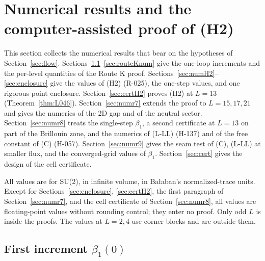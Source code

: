 \section{Numerical results and the computer-assisted proof of (H2)}\label{sec:numerics}

This section collects the numerical results that bear on the hypotheses of Section~\ref{sec:flow}. Sections~\ref{sec:beta1}--\ref{sec:routeKnum} give the one-loop increments and the per-level quantities of the Route K proof. Sections~\ref{sec:numH2}--\ref{sec:enclosure} give the values of (H2) (R-025), the one-step values, and one rigorous point enclosure. Section~\ref{sec:certH2} proves (H2) at $L=13$ (Theorem~\ref{thm:L046}). Section~\ref{sec:numr7} extends the proof to $L=15,17,21$ and gives the numerics of the 2D gap and of the neutral sector. Section~\ref{sec:numr8} treats the single-step $\beta_1$, a second certificate at $L=13$ on part of the Brillouin zone, and the numerics of (L-LL) (H-137) and of the free constant of (C) (H-057). Section~\ref{sec:numr9} gives the seam test of (C), (L-LL) at smaller flux, and the converged-grid values of $\beta_1$. Section~\ref{sec:cert} gives the design of the cell certificate.

All values are for SU(2), in infinite volume, in Ba{\l}aban's normalized-trace units. Except for Sections~\ref{sec:enclosure}, \ref{sec:certH2}, the first paragraph of Section~\ref{sec:numr7}, and the cell certificate of Section~\ref{sec:numr8}, all values are floating-point values without rounding control; they enter no proof. Only odd $L$ is inside the proofs. The values at $L=2,4$ use corner blocks and are outside them.

\subsection{First increment $\beta_1(0)$}\label{sec:beta1}

